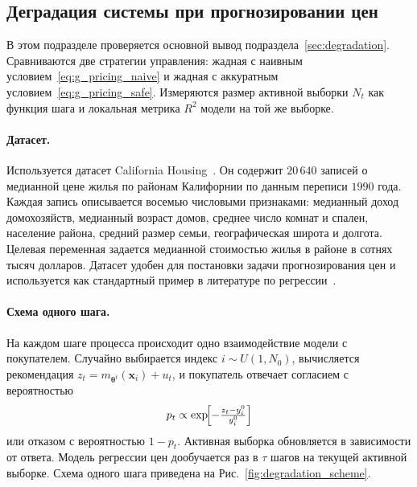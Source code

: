\documentclass[a4paper,14pt,oneside,openany]{extarticle}
\newcommand{\bx}{\mathbf{x}}
\newcommand{\btheta}{\boldsymbol{\theta}}
\begin{document}
\subsection{Деградация системы при прогнозировании цен}\label{sec:exp_degradation}

В этом подразделе проверяется основной вывод подраздела~\ref{sec:degradation}. Сравниваются две стратегии управления: жадная с наивным условием~\eqref{eq:g_pricing_naive} и жадная с аккуратным условием~\eqref{eq:g_pricing_safe}. Измеряются размер активной выборки $N_t$ как функция шага и локальная метрика $R^2$ модели на той же выборке.

\paragraph{Датасет.}
Используется датасет California Housing~\cite{pace1997sparse}. Он содержит $20\,640$ записей о медианной цене жилья по районам Калифорнии по данным переписи $1990$ года. Каждая запись описывается восемью числовыми признаками: медианный доход домохозяйств, медианный возраст домов, среднее число комнат и спален, население района, средний размер семьи, географическая широта и долгота. Целевая переменная задается медианной стоимостью жилья в районе в сотнях тысяч долларов. Датасет удобен для постановки задачи прогнозирования цен и используется как стандартный пример в литературе по регрессии~\cite{geron2019hands, molnar2022interpretable, pedregosa2011scikit}.

\paragraph{Схема одного шага.}
На каждом шаге процесса происходит одно взаимодействие модели с покупателем. Случайно выбирается индекс $i \sim U(1, N_0)$, вычисляется рекомендация $z_t = m_{\btheta^t}(\bx_i) + u_t$, и покупатель отвечает согласием с вероятностью
\[
    p_t \propto \exp\!\Bigl[-\tfrac{z_t - y_i^0}{y_i^0}\Bigr]
\]
или отказом с вероятностью $1 - p_t$. Активная выборка обновляется в зависимости от ответа. Модель регрессии цен дообучается раз в $\tau$ шагов на текущей активной выборке. Схема одного шага приведена на Рис.~\ref{fig:degradation_scheme}.
\end{document}
